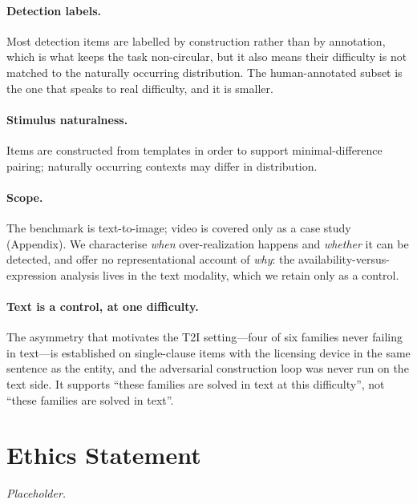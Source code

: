 \documentclass{article}
\begin{document}
\paragraph{Detection labels.} Most detection items are labelled by construction rather
than by annotation, which is what keeps the task non-circular, but it also means their
difficulty is not matched to the naturally occurring distribution. The human-annotated
subset is the one that speaks to real difficulty, and it is smaller.

\paragraph{Stimulus naturalness.} Items are constructed from templates in order to
support minimal-difference pairing; naturally occurring contexts may differ in
distribution.

\paragraph{Scope.} The benchmark is text-to-image; video is covered only as a case study
(Appendix). We characterise \emph{when} over-realization happens and \emph{whether} it can
be detected, and offer no representational account of \emph{why}: the availability-versus-
expression analysis lives in the text modality, which we retain only as a control.

\paragraph{Text is a control, at one difficulty.} The asymmetry that motivates the T2I
setting---four of six families never failing in text---is established on single-clause
items with the licensing device in the same sentence as the entity, and the adversarial
construction loop was never run on the text side. It supports ``these families are solved
in text at this difficulty'', not ``these families are solved in text''.

\section*{Ethics Statement}
\emph{Placeholder.}
\end{document}
